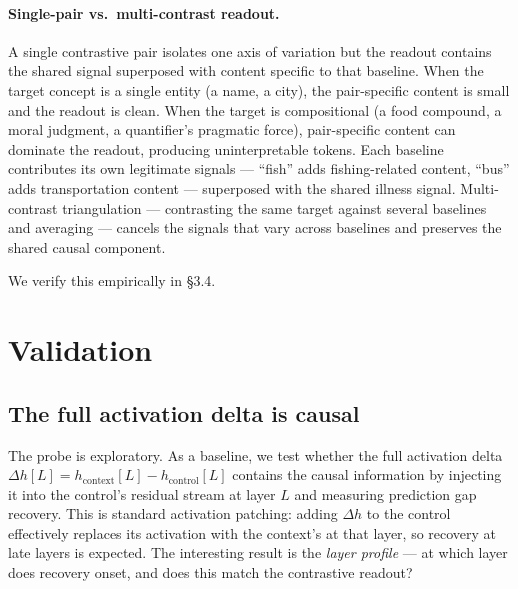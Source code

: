 \documentclass[11pt]{article}
\newcommand{\dhh}{\Delta h}
\begin{document}
\paragraph{Single-pair vs.\ multi-contrast readout.} A single contrastive pair
isolates one axis of variation but the readout contains the shared signal
superposed with content specific to that baseline. When the target concept
is a single entity (a name, a city), the pair-specific content is small
and the readout is clean. When the target is compositional (a food compound,
a moral judgment, a quantifier's pragmatic force), pair-specific content
can dominate the readout, producing
uninterpretable tokens. Each baseline contributes its own legitimate
signals --- ``fish'' adds fishing-related content, ``bus'' adds transportation
content --- superposed with the shared illness signal. Multi-contrast
triangulation --- contrasting the same target against several baselines and
averaging --- cancels the signals that vary across baselines and preserves
the shared causal component.

We verify this empirically in \S3.4.

\section{Validation}

\subsection{The full activation delta is causal}

The probe is exploratory. As a baseline,
we test whether the full activation delta $\dhh[L] = h_\text{context}[L] - h_\text{control}[L]$
contains the causal information by injecting it into the control's residual
stream at layer $L$ and measuring prediction gap recovery. This is standard
activation patching: adding $\dhh$ to the control effectively replaces its
activation with the context's at that layer, so recovery at late layers is
expected. The interesting result is the \emph{layer profile} --- at which layer does
recovery onset, and does this match the contrastive readout?
\end{document}

